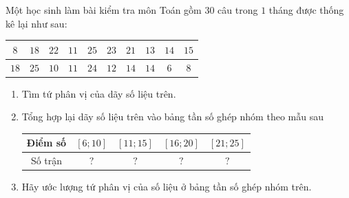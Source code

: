 \begin{ex}%
	Một học sinh làm bài kiểm tra môn Toán gồm $30$ câu trong $1$ tháng được thống kê lại như sau: 
	\begin{center}
		\begin{tabular}{|c|c|c|c|c|c|c|c|c|c|}
			\hline $8$ & $18$ & $22$ & $11$ &  $25$ & $23$ & $21$ & $13$ & $14$ & $15$ \\
			\hline $18$ & $25$ & $10$ & $11$ & $24$ & $12$ & $14$ & $14$ & $6$ &  $8$ \\
			 \hline
		\end{tabular}
	\end{center}
	\begin{enumerate}
		 \item Tìm tứ phân vị của dãy số liệu trên.
		\item Tổng hợp lại dãy số liệu trên vào bảng tần số ghép nhóm theo  mẫu sau
		\begin{center}
			\begin{tabular}{|c|c|c|c|c|}
				\hline Điểm số &$[6; 10]$ &$[11; 15]$ &$[16;  20]$ &$[21; 25]$ \\
				\hline Số trận & $?$ & $?$  & $?$ & $?$ \\
				 \hline
			\end{tabular}
		\end{center}
		\item Hãy ước  lượng tứ phân vị của số liệu ở bảng tần số ghép nhóm trên.
	\end{enumerate}
\end{ex}

